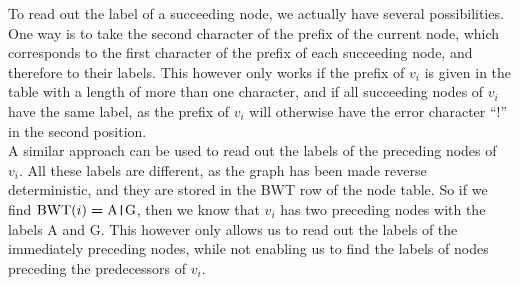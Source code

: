 \documentclass[a4paper,12pt,twoside,BCOR=10mm]{scrbook}
\def\pipe{\texttt{|}}
\begin{document}
To read out the label of a succeeding node, we actually have several possibilities.
One way is to take the second character of the prefix of the current node,
which corresponds to the first character of the prefix of each succeeding node,
and therefore to their labels. This however only works if the prefix of $ v_i $ is
given in the table with a length of more than one character, and if all succeeding nodes
of $ v_i $ have the same label, as the prefix of $ v_i $ will otherwise have the
error character “!” in the second position. \\
A similar approach can be used to read out the labels of the preceding nodes of $ v_i $.
All these labels are different, as the graph has been made reverse deterministic,
and they are stored in the BWT row of the node table. So if we find $ \textrm{BWT} ( i ) \boldsymbol{=} \textrm{A{\pipe}G} $,
then we know that $ v_i $ has two preceding nodes with the labels A and G.
This however only allows us to read out the labels of the immediately preceding nodes,
while not enabling us to find the labels of nodes preceding the predecessors of $ v_i $.
\end{document}
